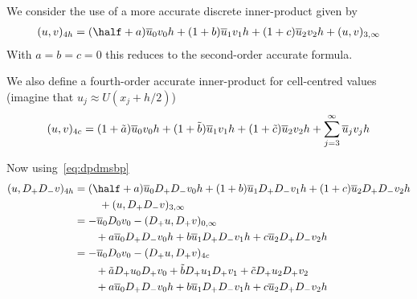We consider the use of a more accurate discrete inner-product given
by 
\begin{align}
  (u,v)_{4h}  =   (\half+a)\ubar_0 v_0 h + (1+b)\ubar_1 v_1 h + (1+c)\ubar_2 v_2 h + (u,v)_{3,\infty}
\end{align}
With $a=b=c=0$ this reduces to the second-order accurate formula.

\newcommand{\ac}{\tilde{a}}
\newcommand{\bc}{\tilde{b}}
\newcommand{\cc}{\tilde{c}}
We also define a fourth-order accurate inner-product for cell-centred values (imagine that $u_j\approx U(x_j+h/2)$)
\begin{align}
  (u,v)_{4c} =  (1+\ac)\ubar_{0} v_{0} h + (1+\bc)\ubar_{1} v_{1} h + (1+\cc)\ubar_{2} v_{2} h 
             + \sum_{j=3}^\infty \ubar_{j} v_{j} h
\end{align}

\clearpage %
Now using~\eqref{eq:dpdmsbp}
\begin{align*}
  (u,D_+D_- v)_{4h} & = (\half+a)\ubar_0 D_+D_- v_0 h + (1+b)\ubar_1 D_+D_- v_1 h + (1+c)\ubar_2 D_+D_- v_2 h \\
            &   ~~~~~~~+ (u,D_+D_- v)_{3,\infty}\\
          &= - \ubar_0 D_0 v_0 - (D_+ u, D_+ v)_{0,\infty}  \\
            &   ~~~~~~  + a\ubar_0 D_+D_- v_0 h + b\ubar_1 D_+D_- v_1 h + c\ubar_2 D_+D_- v_2 h \\
          &= - \ubar_0 D_0 v_0 - (D_+ u, D_+ v)_{4c}  \\
            &~~~~~~   +\ac D_+ u_0 D_+ v_0 +\bc D_+ u_1 D_+ v_1 +\cc D_+ u_2 D_+ v_2 \\
            & ~~~~~~ + a\ubar_0 D_+D_- v_0 h + b\ubar_1 D_+D_- v_1 h + c\ubar_2 D_+D_- v_2 h  
\end{align*}


